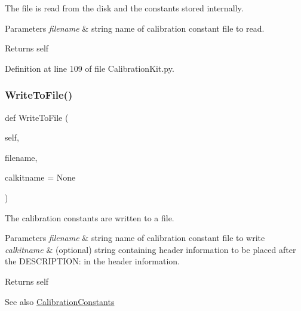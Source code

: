 The file is read from the disk and the constants stored internally. 


\begin{DoxyParams}{Parameters}
{\em filename} & string name of calibration constant file to read. \\
\hline
\end{DoxyParams}
\begin{DoxyReturn}{Returns}
self 
\end{DoxyReturn}


Definition at line 109 of file Calibration\+Kit.\+py.

\mbox{\label{classSignalIntegrity_1_1Measurement_1_1CalKit_1_1CalibrationKit_1_1CalibrationConstants_ac68713cc133371d7a733dd318b5669d3}} 
\subsubsection{\texorpdfstring{Write\+To\+File()}{WriteToFile()}}
{\footnotesize\ttfamily def Write\+To\+File (\begin{DoxyParamCaption}\item[{}]{self,  }\item[{}]{filename,  }\item[{}]{calkitname = {\ttfamily None} }\end{DoxyParamCaption})}



The calibration constants are written to a file. 


\begin{DoxyParams}{Parameters}
{\em filename} & string name of calibration constant file to write \\
\hline
{\em calkitname} & (optional) string containing header information to be placed after the D\+E\+S\+C\+R\+I\+P\+T\+I\+ON\+: in the header information. \\
\hline
\end{DoxyParams}
\begin{DoxyReturn}{Returns}
self 
\end{DoxyReturn}
\begin{DoxySeeAlso}{See also}
\hyperlink{classSignalIntegrity_1_1Measurement_1_1CalKit_1_1CalibrationKit_1_1CalibrationConstants}{Calibration\+Constants} 
\end{DoxySeeAlso}


